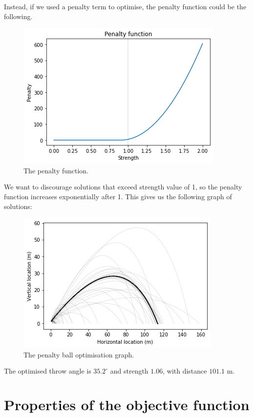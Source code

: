 \documentclass[a4paper, openany]{memoir}
\begin{document}
Instead, if we used a penalty term to optimise, the penalty function could be the following.
\begin{figure}[H]
    \centering
    \includegraphics[scale=0.6]{src/4.5 penalty function.png}
    \caption{The penalty function.}
\end{figure}
\noindent We want to discourage solutions that exceed strength value of 1, so the penalty function increases exponentially after 1. This gives us the following graph of solutions:
\begin{figure}[H]
    \centering
    \includegraphics[scale=0.7]{src/4.6 penalty ball optimisation.png}
    \caption{The penalty ball optimisation graph.}
\end{figure}
\noindent The optimised throw angle is $35.2^{\circ}$ and strength $1.06$, with distance $101.1$ m.
\newpage

\section{Properties of the objective function}
\end{document}

